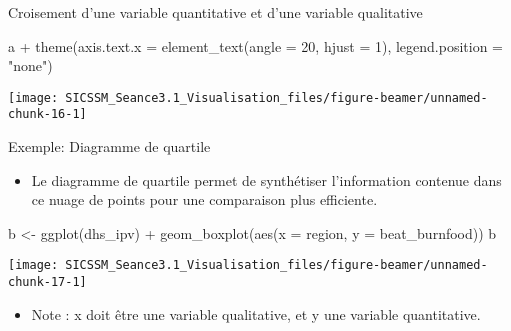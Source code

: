 \documentclass[
  ignorenonframetext,
]{beamer}
\newenvironment{Shaded}{\begin{snugshade}}{\end{snugshade}}
\newcommand{\AttributeTok}[1]{\textcolor[rgb]{0.77,0.63,0.00}{#1}}
\newcommand{\DecValTok}[1]{\textcolor[rgb]{0.00,0.00,0.81}{#1}}
\newcommand{\FunctionTok}[1]{\textcolor[rgb]{0.00,0.00,0.00}{#1}}
\newcommand{\NormalTok}[1]{#1}
\newcommand{\OtherTok}[1]{\textcolor[rgb]{0.56,0.35,0.01}{#1}}
\newcommand{\SpecialCharTok}[1]{\textcolor[rgb]{0.00,0.00,0.00}{#1}}
\newcommand{\StringTok}[1]{\textcolor[rgb]{0.31,0.60,0.02}{#1}}
\providecommand{\tightlist}{%
  \setlength{\itemsep}{0pt}\setlength{\parskip}{0pt}}
\begin{document}
\begin{frame}[fragile]{Croisement d'une variable quantitative et d'une
variable qualitative}
\protect\hypertarget{croisement-dune-variable-quantitative-et-dune-variable-qualitative-3}{}
\begin{Shaded}
\begin{Highlighting}[]
\NormalTok{a }\SpecialCharTok{+} 
  \FunctionTok{theme}\NormalTok{(}\AttributeTok{axis.text.x =} \FunctionTok{element\_text}\NormalTok{(}\AttributeTok{angle =} \DecValTok{20}\NormalTok{, }\AttributeTok{hjust =} \DecValTok{1}\NormalTok{),}
        \AttributeTok{legend.position =} \StringTok{"none"}\NormalTok{)}
\end{Highlighting}
\end{Shaded}

\begin{center}\texttt{[image: SICSSM\_Seance3.1\_Visualisation\_files/figure-beamer/unnamed-chunk-16-1]} \end{center}
\end{frame}

\begin{frame}[fragile]{Exemple: Diagramme de quartile}
\protect\hypertarget{exemple-diagramme-de-quartile-1}{}
\begin{itemize}
\tightlist
\item
  Le diagramme de quartile permet de synthétiser l'information contenue
  dans ce nuage de points pour une comparaison plus efficiente.
\end{itemize}

\begin{Shaded}
\begin{Highlighting}[]
\NormalTok{b }\OtherTok{\textless{}{-}} \FunctionTok{ggplot}\NormalTok{(dhs\_ipv) }\SpecialCharTok{+} 
  \FunctionTok{geom\_boxplot}\NormalTok{(}\FunctionTok{aes}\NormalTok{(}\AttributeTok{x =}\NormalTok{ region, }\AttributeTok{y =}\NormalTok{ beat\_burnfood))}
\NormalTok{b}
\end{Highlighting}
\end{Shaded}

\begin{center}\texttt{[image: SICSSM\_Seance3.1\_Visualisation\_files/figure-beamer/unnamed-chunk-17-1]} \end{center}

\begin{itemize}
\tightlist
\item
  Note : x doit être une variable qualitative, et y une variable
  quantitative.
\end{itemize}
\end{frame}
\end{document}
